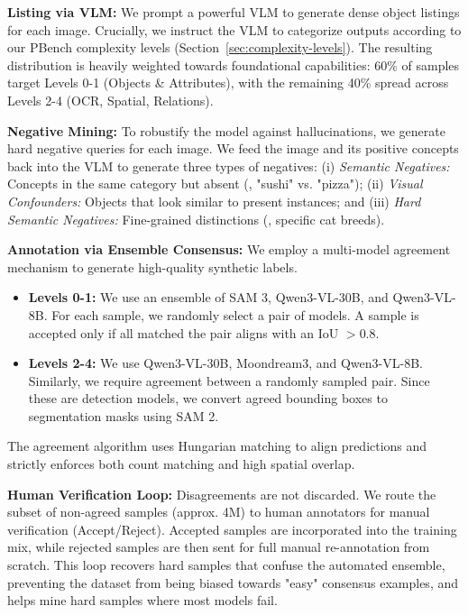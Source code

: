 \noindent \textbf{Listing via VLM:}
We prompt a powerful  VLM to generate dense object listings for each image. Crucially, we instruct the VLM to categorize outputs according to our PBench complexity levels (Section~\ref{sec:complexity-levels}). The resulting distribution is heavily weighted towards foundational capabilities: 60\% of samples target Levels 0-1 (Objects \& Attributes), with the remaining 40\% spread across Levels 2-4 (OCR, Spatial, Relations).

\noindent \textbf{Negative Mining:}
To robustify the model against hallucinations, we generate hard negative queries for each image. We feed the image and its positive concepts back into the VLM to generate three types of negatives: (i) \textit{Semantic Negatives:} Concepts in the same category but absent (\eg, "sushi" vs. "pizza"); (ii) \textit{Visual Confounders:} Objects that look similar to present instances; and (iii) \textit{Hard Semantic Negatives:} Fine-grained distinctions (\eg, specific cat breeds).

\noindent \textbf{Annotation via Ensemble Consensus:}
We employ a multi-model agreement mechanism to generate high-quality synthetic  labels.
\begin{itemize}
    \item \textbf{Levels 0-1:} We use an ensemble of SAM 3, Qwen3-VL-30B, and Qwen3-VL-8B. For each sample, we randomly select a pair of models. A sample is accepted only if all matched the pair aligns with an IoU $> 0.8$.
    \item \textbf{Levels 2-4:} We use Qwen3-VL-30B, Moondream3, and Qwen3-VL-8B. Similarly, we require agreement between a randomly sampled pair. Since these are detection models, we convert agreed bounding boxes to segmentation masks using SAM 2.
\end{itemize}

The agreement algorithm uses Hungarian matching to align predictions and strictly enforces both count matching and high spatial overlap.

\noindent \textbf{Human Verification Loop:}
Disagreements are not discarded. We route the subset of non-agreed samples (approx. 4M) to human annotators for manual verification (Accept/Reject). Accepted samples are incorporated into the training mix, while rejected samples are then sent for full manual re-annotation from scratch. This loop recovers hard samples that confuse the automated ensemble, preventing the dataset from being biased towards "easy" consensus examples, and helps mine hard samples where most models fail.


